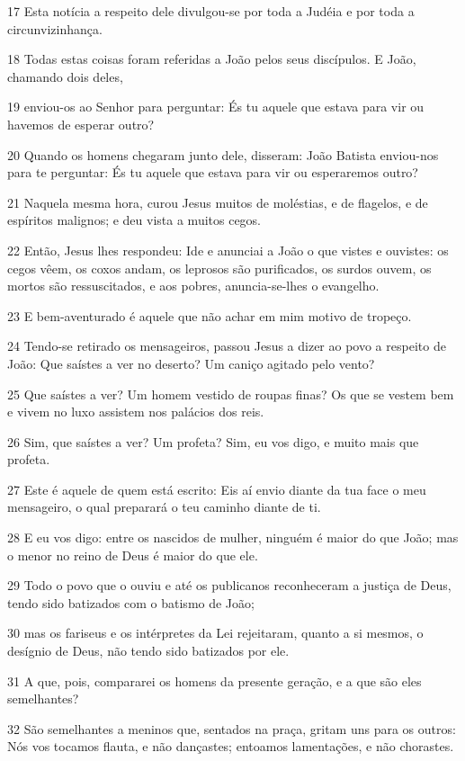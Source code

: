 \par 17 Esta notícia a respeito dele divulgou-se por toda a Judéia e por toda a circunvizinhança.
\par 18 Todas estas coisas foram referidas a João pelos seus discípulos. E João, chamando dois deles,
\par 19 enviou-os ao Senhor para perguntar: És tu aquele que estava para vir ou havemos de esperar outro?
\par 20 Quando os homens chegaram junto dele, disseram: João Batista enviou-nos para te perguntar: És tu aquele que estava para vir ou esperaremos outro?
\par 21 Naquela mesma hora, curou Jesus muitos de moléstias, e de flagelos, e de espíritos malignos; e deu vista a muitos cegos.
\par 22 Então, Jesus lhes respondeu: Ide e anunciai a João o que vistes e ouvistes: os cegos vêem, os coxos andam, os leprosos são purificados, os surdos ouvem, os mortos são ressuscitados, e aos pobres, anuncia-se-lhes o evangelho.
\par 23 E bem-aventurado é aquele que não achar em mim motivo de tropeço.
\par 24 Tendo-se retirado os mensageiros, passou Jesus a dizer ao povo a respeito de João: Que saístes a ver no deserto? Um caniço agitado pelo vento?
\par 25 Que saístes a ver? Um homem vestido de roupas finas? Os que se vestem bem e vivem no luxo assistem nos palácios dos reis.
\par 26 Sim, que saístes a ver? Um profeta? Sim, eu vos digo, e muito mais que profeta.
\par 27 Este é aquele de quem está escrito: Eis aí envio diante da tua face o meu mensageiro, o qual preparará o teu caminho diante de ti.
\par 28 E eu vos digo: entre os nascidos de mulher, ninguém é maior do que João; mas o menor no reino de Deus é maior do que ele.
\par 29 Todo o povo que o ouviu e até os publicanos reconheceram a justiça de Deus, tendo sido batizados com o batismo de João;
\par 30 mas os fariseus e os intérpretes da Lei rejeitaram, quanto a si mesmos, o desígnio de Deus, não tendo sido batizados por ele.
\par 31 A que, pois, compararei os homens da presente geração, e a que são eles semelhantes?
\par 32 São semelhantes a meninos que, sentados na praça, gritam uns para os outros: Nós vos tocamos flauta, e não dançastes; entoamos lamentações, e não chorastes.
